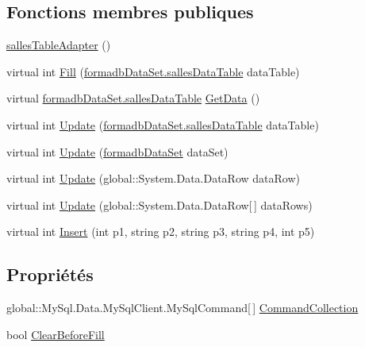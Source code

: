 \subsection*{Fonctions membres publiques}
\begin{DoxyCompactItemize}
\item 
\hyperlink{classforma_1_1formadb_data_set_table_adapters_1_1salles_table_adapter_ac0ef7753c8e1dd48a58831eca8927d33}{salles\+Table\+Adapter} ()
\item 
virtual int \hyperlink{classforma_1_1formadb_data_set_table_adapters_1_1salles_table_adapter_a2e7405c2012fdf04e09017971a7a6cb4}{Fill} (\hyperlink{classforma_1_1formadb_data_set_1_1salles_data_table}{formadb\+Data\+Set.\+salles\+Data\+Table} data\+Table)
\item 
virtual \hyperlink{classforma_1_1formadb_data_set_1_1salles_data_table}{formadb\+Data\+Set.\+salles\+Data\+Table} \hyperlink{classforma_1_1formadb_data_set_table_adapters_1_1salles_table_adapter_a853251cb42766452c98481bdd3586807}{Get\+Data} ()
\item 
virtual int \hyperlink{classforma_1_1formadb_data_set_table_adapters_1_1salles_table_adapter_a0d4c040c6307170d84a0cccc491ac3b1}{Update} (\hyperlink{classforma_1_1formadb_data_set_1_1salles_data_table}{formadb\+Data\+Set.\+salles\+Data\+Table} data\+Table)
\item 
virtual int \hyperlink{classforma_1_1formadb_data_set_table_adapters_1_1salles_table_adapter_a4662bcc05f5ba259815028bb7dd2a429}{Update} (\hyperlink{classforma_1_1formadb_data_set}{formadb\+Data\+Set} data\+Set)
\item 
virtual int \hyperlink{classforma_1_1formadb_data_set_table_adapters_1_1salles_table_adapter_a27de9871875d14840f16569329b96a8e}{Update} (global\+::\+System.\+Data.\+Data\+Row data\+Row)
\item 
virtual int \hyperlink{classforma_1_1formadb_data_set_table_adapters_1_1salles_table_adapter_a89b188bbde78fab8e81f41c1ceef2d06}{Update} (global\+::\+System.\+Data.\+Data\+Row\mbox{[}$\,$\mbox{]} data\+Rows)
\item 
virtual int \hyperlink{classforma_1_1formadb_data_set_table_adapters_1_1salles_table_adapter_a2a8dc202974526cb0b26e90b168550b4}{Insert} (int p1, string p2, string p3, string p4, int p5)
\end{DoxyCompactItemize}
\subsection*{Propriétés}
\begin{DoxyCompactItemize}
\item 
global\+::\+My\+Sql.\+Data.\+My\+Sql\+Client.\+My\+Sql\+Command\mbox{[}$\,$\mbox{]} \hyperlink{classforma_1_1formadb_data_set_table_adapters_1_1salles_table_adapter_ab4bf2eaf56788124614c9b02396e91d0}{Command\+Collection}
\item 
bool \hyperlink{classforma_1_1formadb_data_set_table_adapters_1_1salles_table_adapter_ae6d40a0ec02343854e975bc4cd7d066f}{Clear\+Before\+Fill}
\end{DoxyCompactItemize}


